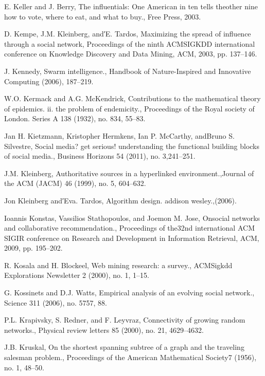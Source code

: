 \begin{thebibliography}{999}
 E. Keller and J. Berry, The influentials: One American in ten tells theother nine how to vote, where to eat, and what to buy., Free Press, 2003.

 D. Kempe, J.M. Kleinberg, and′E. Tardos, Maximizing the spread of influence through a social network, Proceedings of the ninth ACMSIGKDD international conference on Knowledge Discovery and Data Mining, ACM, 2003, pp. 137–146.

 J. Kennedy, Swarm intelligence., Handbook of Nature-Inspired and Innovative Computing (2006), 187–219.

 W.O. Kermack and A.G. McKendrick, Contributions to the mathematical theory of epidemics. ii. the problem of endemicity., Proceedings of the Royal society of London. Series A 138 (1932), no. 834, 55–83.

 Jan H. Kietzmann, Kristopher Hermkens, Ian P. McCarthy, andBruno S. Silvestre, Social media? get serious! understanding the functional building blocks of social media., Business Horizons 54 (2011), no. 3,241–251.

 J.M. Kleinberg, Authoritative sources in a hyperlinked environment.,Journal of the ACM (JACM) 46 (1999), no. 5, 604–632.

 Jon Kleinberg and′Eva. Tardos, Algorithm design. addison wesley.,(2006).

 Ioannis Konstas, Vassilios Stathopoulos, and Joemon M. Jose, Onsocial networks and collaborative recommendation., Proceedings of the32nd international ACM SIGIR conference on Research and Development in Information Retrieval, ACM, 2009, pp. 195–202.

 R. Kosala and H. Blockeel, Web mining research: a survey., ACMSigkdd Explorations Newsletter 2 (2000), no. 1, 1–15.

 G. Kossinets and D.J. Watts, Empirical analysis of an evolving social network., Science 311 (2006), no. 5757, 88.

 P.L. Krapivsky, S. Redner, and F. Leyvraz, Connectivity of growing random networks., Physical review letters 85 (2000), no. 21, 4629–4632.

 J.B. Kruskal, On the shortest spanning subtree of a graph and the traveling salesman problem., Proceedings of the American Mathematical Society7 (1956), no. 1, 48–50.


\end{thebibliography}
